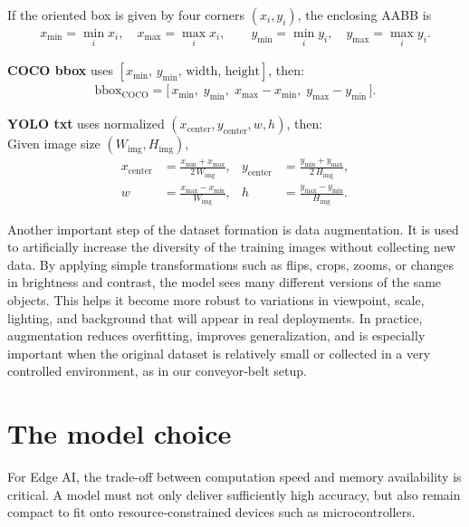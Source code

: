 \documentclass[12pt,a4paper]{report}
\begin{document}
    If the oriented box is given by four corners $(x_i,y_i)$, the enclosing AABB is
    \begin{align}
    x_{\min}=\min_i x_i,\quad x_{\max}=\max_i x_i,\qquad
    y_{\min}=\min_i y_i,\quad y_{\max}=\max_i y_i .
    \end{align}

    \textbf{COCO bbox} uses $[x_{\min},\,y_{\min},\,\text{width},\,\text{height}]$, then: \\
    \begin{align}
    \text{bbox}_{\text{COCO}}
    = \bigl[\, x_{\min},\; y_{\min},\; x_{\max}-x_{\min},\; y_{\max}-y_{\min} \,\bigr].
    \end{align}

    \textbf{YOLO txt} uses normalized $(x_\text{center},y_\text{center},w,h)$, then: \\
    Given image size $(W_{\text{img}},H_{\text{img}})$,
    \begin{align}
    x_\text{center} &= \frac{x_{\min}+x_{\max}}{2\,W_{\text{img}}}, &
    y_\text{center} &= \frac{y_{\min}+y_{\max}}{2\,H_{\text{img}}}, \\
    w               &= \frac{x_{\max}-x_{\min}}{W_{\text{img}}}, &
    h               &= \frac{y_{\max}-y_{\min}}{H_{\text{img}}}.
    \end{align}

    Another important step of the dataset formation is data augmentation. It is used to artificially increase
    the diversity of the training images without collecting new data. By applying simple transformations such as flips,
    crops, zooms, or changes in brightness and contrast, the model sees many different versions of the same objects.
    This helps it become more robust to variations in viewpoint, scale, lighting, and background that will appear
    in real deployments. In practice, augmentation reduces overfitting, improves generalization, and is especially
    important when the original dataset is relatively small or collected in a very controlled environment,
    as in our conveyor-belt setup.

\section{The model choice}

    For Edge AI, the trade-off between computation speed and
    memory availability is critical. A model must not only deliver
    sufficiently high accuracy, but also remain compact to fit
    onto resource-constrained devices such as microcontrollers.
\end{document}
